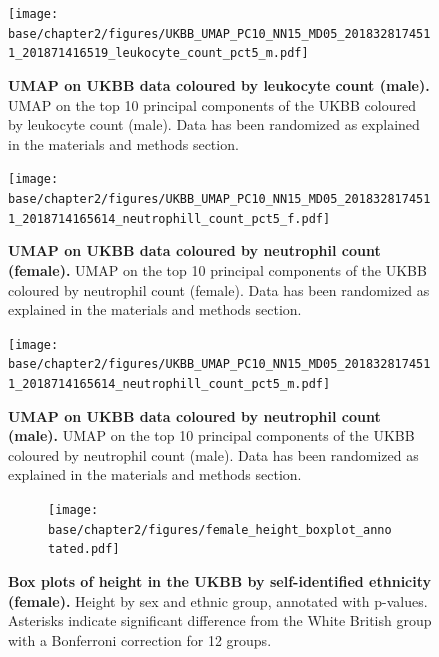 \newpage

\begin{figure}[ht]
    \centering
    \texttt{[image: base/chapter2/figures/UKBB\_UMAP\_PC10\_NN15\_MD05\_2018328174511\_201871416519\_leukocyte\_count\_pct5\_m.pdf]}
    \caption[UMAP on UKBB data coloured by leukocyte count (male)]{\textbf{UMAP on UKBB data coloured by leukocyte count (male).} UMAP on the top 10 principal components of the UKBB coloured by leukocyte count (male). Data has been randomized as explained in the materials and methods section.}
    \label{fig:supp_ukbb_leukocyte_m}
\end{figure}

\newpage

\begin{figure}[ht]
    \centering
    \texttt{[image: base/chapter2/figures/UKBB\_UMAP\_PC10\_NN15\_MD05\_2018328174511\_2018714165614\_neutrophill\_count\_pct5\_f.pdf]}
    \caption[UMAP on UKBB data coloured by neutrophil count (female)]{\textbf{UMAP on UKBB data coloured by neutrophil count (female).} UMAP on the top 10 principal components of the UKBB coloured by neutrophil count (female). Data has been randomized as explained in the materials and methods section.}
    \label{fig:supp_ukbb_neutrophill_f}
\end{figure}

\newpage

\begin{figure}[ht]
    \centering
    \texttt{[image: base/chapter2/figures/UKBB\_UMAP\_PC10\_NN15\_MD05\_2018328174511\_2018714165614\_neutrophill\_count\_pct5\_m.pdf]}
    \caption[UMAP on UKBB data coloured by neutrophil count (male)]{\textbf{UMAP on UKBB data coloured by neutrophil count (male).} UMAP on the top 10 principal components of the UKBB coloured by neutrophil count (male). Data has been randomized as explained in the materials and methods section.}
    \label{fig:supp_ukbb_neutrophill_m}
\end{figure}

\newpage

\begin{figure}[ht]
    \centering
    \begin{subfigure}{\textwidth}
    \texttt{[image: base/chapter2/figures/female\_height\_boxplot\_annotated.pdf]}
    \end{subfigure}
    \caption[Box plots of height in the UKBB by self-identified ethnicity (female)]{\textbf{Box plots of height in the UKBB by self-identified ethnicity (female).} Height by sex and ethnic group, annotated with p-values. Asterisks indicate significant difference from the White British group with a Bonferroni correction for 12 groups.}
    \label{fig:supp_box_height_f}
\end{figure}

